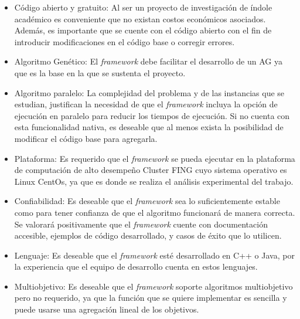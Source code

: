 \begin{itemize}
	\item Código abierto y gratuito: Al ser un proyecto de investigación de índole académico es conveniente que no existan costos económicos asociados. Además, es importante que se cuente con el código abierto con el fin de introducir modificaciones en el código base o corregir errores.
	\item Algoritmo Genético: El \emph{framework} debe facilitar el desarrollo de un AG ya que es la base en la que se sustenta el proyecto.
	\item Algoritmo paralelo: La complejidad del problema y de las instancias que se estudian, justifican la necesidad de que el \emph{framework} incluya la opción de ejecución en paralelo para reducir los tiempos de ejecución. Si no cuenta con esta funcionalidad nativa, es deseable que al menos exista la posibilidad de modificar el código base para agregarla.
	\item Plataforma: Es requerido que el \emph{framework} se pueda ejecutar en la plataforma de computación de alto desempeño Cluster FING cuyo sistema operativo es Linux CentOs, ya que es donde se realiza el análisis experimental del trabajo. 
	\item Confiabilidad: Es deseable que el \emph{framework} sea lo suficientemente estable como para tener confianza de que el algoritmo funcionará de manera correcta. Se valorará positivamente que el \emph{framework} cuente con documentación accesible, ejemplos de código desarrollado, y casos de éxito que lo utilicen.
	\item Lenguaje: Es deseable que el \emph{framework} esté desarrollado en C++ o Java, por la experiencia que el equipo de desarrollo cuenta en estos lenguajes. 
	\item Multiobjetivo: Es deseable que el \emph{framework} soporte algoritmos multiobjetivo pero no requerido, ya que la función que se quiere implementar es sencilla y puede usarse una agregación lineal de los objetivos.
\end{itemize} 

